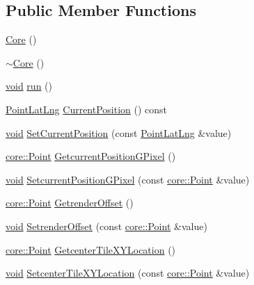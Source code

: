 \subsection*{\-Public \-Member \-Functions}
\begin{DoxyCompactItemize}
\item 
\hyperlink{group___o_p_map_widget_ga7ec14a145f0d7ff3036d68814659e27d}{\-Core} ()
\item 
\hyperlink{group___o_p_map_widget_ga6ad5ec431c303aa0ea029c86fc7a5728}{$\sim$\-Core} ()
\item 
\hyperlink{group___u_a_v_objects_plugin_ga444cf2ff3f0ecbe028adce838d373f5c}{void} \hyperlink{group___o_p_map_widget_ga0d0ab90f1256808e363cd35dd5f2fa7f}{run} ()
\item 
\hyperlink{structinternals_1_1_point_lat_lng}{\-Point\-Lat\-Lng} \hyperlink{group___o_p_map_widget_ga44a14bf2d358ec5f93c7a99416e20732}{\-Current\-Position} () const 
\item 
\hyperlink{group___u_a_v_objects_plugin_ga444cf2ff3f0ecbe028adce838d373f5c}{void} \hyperlink{group___o_p_map_widget_ga4e5d816fef373048f1109beac294521c}{\-Set\-Current\-Position} (const \hyperlink{structinternals_1_1_point_lat_lng}{\-Point\-Lat\-Lng} \&value)
\item 
\hyperlink{structcore_1_1_point}{core\-::\-Point} \hyperlink{group___o_p_map_widget_ga705325edd0aba942d5a67990c7d07136}{\-Getcurrent\-Position\-G\-Pixel} ()
\item 
\hyperlink{group___u_a_v_objects_plugin_ga444cf2ff3f0ecbe028adce838d373f5c}{void} \hyperlink{group___o_p_map_widget_ga68af707707e7a27c72969b84ffcdc206}{\-Setcurrent\-Position\-G\-Pixel} (const \hyperlink{structcore_1_1_point}{core\-::\-Point} \&value)
\item 
\hyperlink{structcore_1_1_point}{core\-::\-Point} \hyperlink{group___o_p_map_widget_gae32df0621adec51500130103787bf6a0}{\-Getrender\-Offset} ()
\item 
\hyperlink{group___u_a_v_objects_plugin_ga444cf2ff3f0ecbe028adce838d373f5c}{void} \hyperlink{group___o_p_map_widget_ga78c39b61dd28bb05639737d0e72576fe}{\-Setrender\-Offset} (const \hyperlink{structcore_1_1_point}{core\-::\-Point} \&value)
\item 
\hyperlink{structcore_1_1_point}{core\-::\-Point} \hyperlink{group___o_p_map_widget_gad81fc0035925c351630e24e790d7df2d}{\-Getcenter\-Tile\-X\-Y\-Location} ()
\item 
\hyperlink{group___u_a_v_objects_plugin_ga444cf2ff3f0ecbe028adce838d373f5c}{void} \hyperlink{group___o_p_map_widget_gac19546f7c53493b741f4ffccdeb42214}{\-Setcenter\-Tile\-X\-Y\-Location} (const \hyperlink{structcore_1_1_point}{core\-::\-Point} \&value)

\end{DoxyCompactItemize}
